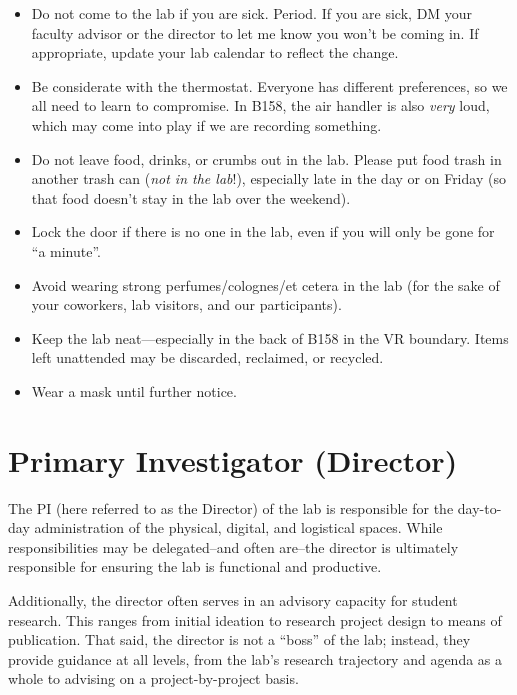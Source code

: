 \documentclass[]{tufte-book}
\providecommand{\tightlist}{%
  \setlength{\itemsep}{0pt}\setlength{\parskip}{0pt}}
\begin{document}
\begin{itemize}
\tightlist
\item
  Do not come to the lab if you are sick. Period. If you are sick, DM your faculty advisor or the director to let me know you won't be coming in. If appropriate, update your lab calendar to reflect the change.
\item
  Be considerate with the thermostat. Everyone has different preferences, so we all need to learn to compromise. In B158, the air handler is also \emph{very} loud, which may come into play if we are recording something.
\item
  Do not leave food, drinks, or crumbs out in the lab. Please put food trash in another trash can (\emph{not in the lab}!), especially late in the day or on Friday (so that food doesn't stay in the lab over the weekend).
\item
  Lock the door if there is no one in the lab, even if you will only be gone for ``a minute''.
\item
  Avoid wearing strong perfumes/colognes/et cetera in the lab (for the sake of your coworkers, lab visitors, and our participants).
\item
  Keep the lab neat---especially in the back of B158 in the VR boundary. Items left unattended may be discarded, reclaimed, or recycled.
\item
  Wear a mask until further notice.
\end{itemize}

\hypertarget{primary-investigator-director}{%
\section{Primary Investigator (Director)}\label{primary-investigator-director}}

The PI (here referred to as the Director) of the lab is responsible for the day-to-day administration of the physical, digital, and logistical spaces. While responsibilities may be delegated--and often are--the director is ultimately responsible for ensuring the lab is functional and productive.

Additionally, the director often serves in an advisory capacity for student research. This ranges from initial ideation to research project design to means of publication. That said, the director is not a ``boss'' of the lab; instead, they provide guidance at all levels, from the lab's research trajectory and agenda as a whole to advising on a project-by-project basis.
\end{document}
